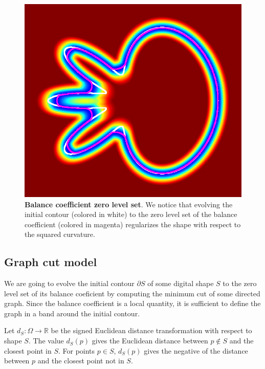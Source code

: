 \documentclass[smallextended]{svjour3}
\begin{document}
\begin{figure}
 \center
 \includegraphics[scale=0.32]{figures/zero-level-set/balance-coefficient-zero-level-set.png}
 \caption{\textbf{Balance coefficient zero level set}. We notice that evolving the initial contour (colored in white) to the zero level set of the balance coefficient (colored in magenta) regularizes the shape with respect to the squared curvature.}
 \label{fig:balance-coefficient-zero-level-set}
 \end{figure}
 
\subsection{Graph cut model}\label{sec:graph-cut-model}

We are going to evolve the initial contour $\partial S$ of some digital shape $S$ to the zero level set of its balance coeficient by computing the minimum cut of some directed graph. Since the balance coefficient is a local quantity, it is sufficient to define the graph in a band around the initial contour.

Let $d_{S}:\Omega \rightarrow \mathbb{R}$ be the signed Euclidean distance transformation with respect to shape $S$. The value $d_{S}(p)$ gives the Euclidean distance between $p \notin S$ and the closest point in $S$. For points $p \in S$, $d_{S}(p)$ gives the negative of the distance between $p$ and the closest point not in $S$.
\end{document}
